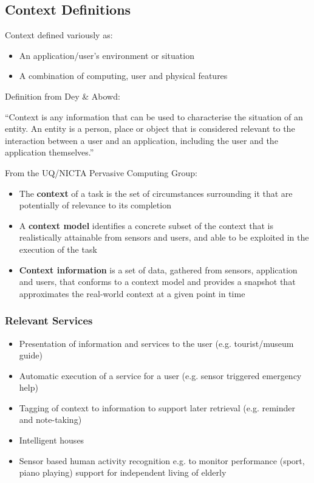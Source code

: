 \subsection{Context Definitions}
Context defined variously as:
\begin{itemize}
	\item An application/user's environment or situation
	\item A combination of computing, user and physical features	
\end{itemize}
Definition from Dey \& Abowd:
\begin{leftbar}
	``Context is any information that can be used to characterise the situation of an entity. An entity is a person, place or object that is considered relevant to the interaction between a user and an application, including the user and the application themselves.''
\end{leftbar}
From the UQ/NICTA Pervasive Computing Group:
\begin{itemize}
	\item The \textbf{context} of a task is the set of circumstances surrounding it that are potentially of relevance to its completion
	\item A \textbf{context model} identifies a concrete subset of the context that is realistically attainable from sensors and users, and able to be exploited in the execution of the task
	\item \textbf{Context information} is a set of data, gathered from sensors, application and users, that conforms to a context model and provides a snapshot that approximates the real-world context at a given point in time	
\end{itemize}

\subsubsection{Relevant Services}
\begin{itemize}
	\item Presentation of information and services to the user (e.g. tourist/museum guide)
	\item Automatic execution of a service for a user (e.g. sensor triggered emergency help)
	\item Tagging of context to information to support later retrieval (e.g. reminder and note-taking)
	\item Intelligent houses
	\item Sensor based human activity recognition
	\subitem e.g. to monitor performance (sport, piano playing)
	\subitem support for independent living of elderly	
\end{itemize}

